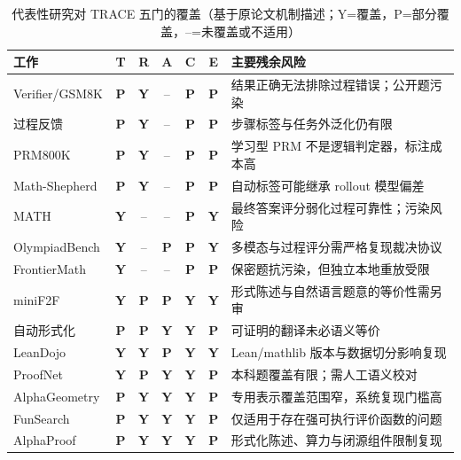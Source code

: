 \documentclass[UTF8,11pt,a4paper,fontset=fandol]{ctexart}
\newcommand{\yes}{\textbf{Y}}
\newcommand{\partialyes}{\textbf{P}}
\newcommand{\no}{--}
\newcommand{\trace}{\textsf{TRACE}}
\begin{document}
\begin{table}[H]
\centering
\scriptsize
\setlength{\tabcolsep}{3pt}
\caption{代表性研究对 \trace{} 五门的覆盖（基于原论文机制描述；Y=覆盖，P=部分覆盖，--=未覆盖或不适用）}
\label{tab:evidence}
\begin{tabularx}{\textwidth}{@{}>{\raggedright\arraybackslash}p{2.8cm}ccccc>{\raggedright\arraybackslash}X@{}}
\toprule
工作 & T & R & A & C & E & 主要残余风险 \\
\midrule
Verifier/GSM8K\cite{cobbe2021verifiers} & \partialyes & \yes & \no & \partialyes & \partialyes & 结果正确无法排除过程错误；公开题污染 \\
过程反馈\cite{uesato2022feedback} & \partialyes & \yes & \no & \partialyes & \partialyes & 步骤标签与任务外泛化仍有限 \\
PRM800K\cite{lightman2024verify} & \partialyes & \yes & \no & \partialyes & \partialyes & 学习型 PRM 不是逻辑判定器，标注成本高 \\
Math-Shepherd\cite{wang2024mathshepherd} & \partialyes & \yes & \no & \partialyes & \partialyes & 自动标签可能继承 rollout 模型偏差 \\
MATH\cite{hendrycks2021math} & \yes & \no & \no & \partialyes & \yes & 最终答案评分弱化过程可靠性；污染风险 \\
OlympiadBench\cite{he2024olympiadbench} & \yes & \no & \partialyes & \partialyes & \yes & 多模态与过程评分需严格复现裁决协议 \\
FrontierMath\cite{glazer2024frontiermath} & \yes & \no & \no & \partialyes & \partialyes & 保密题抗污染，但独立本地重放受限 \\
miniF2F\cite{zheng2022minif2f} & \yes & \partialyes & \partialyes & \yes & \yes & 形式陈述与自然语言题意的等价性需另审 \\
自动形式化\cite{wu2022autoformalization} & \partialyes & \partialyes & \yes & \yes & \partialyes & 可证明的翻译未必语义等价 \\
LeanDojo\cite{yang2023leandojo} & \yes & \yes & \partialyes & \yes & \yes & Lean/mathlib 版本与数据切分影响复现 \\
ProofNet\cite{azerbayev2023proofnet} & \yes & \partialyes & \yes & \yes & \partialyes & 本科题覆盖有限；需人工语义校对 \\
AlphaGeometry\cite{trinh2024alphageometry} & \partialyes & \yes & \yes & \yes & \partialyes & 专用表示覆盖范围窄，系统复现门槛高 \\
FunSearch\cite{romeraparedes2024funsearch} & \partialyes & \yes & \yes & \yes & \partialyes & 仅适用于存在强可执行评价函数的问题 \\
AlphaProof\cite{hubert2026alphaproof} & \partialyes & \yes & \yes & \yes & \partialyes & 形式化陈述、算力与闭源组件限制复现 \\
\bottomrule
\end{tabularx}
\end{table}
\end{document}
